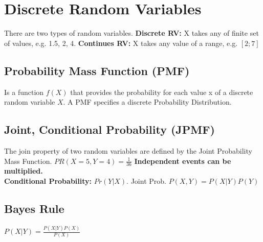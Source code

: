 \section{Discrete Random Variables}
There are two types of random variables.
\textbf{Discrete RV:} X takes any of finite set of values, e.g. {1.5, 2, 4}.
\textbf{Continues RV:} X takes any value of a range, e.g. $[2;7]$

\subsection{Probability Mass Function (PMF)}
Is a function $f(X)$ that provides the probability for each value x of a discrete random variable $X$. A PMF specifies a discrete Probability Distribution. 
\subsection{Joint, Conditional Probability (JPMF)}
The join property of two random variables are defined by the Joint Probability Mass Function. $PR(X=5, Y=4) = \frac{1}{36}$ \textbf{Independent events can be multiplied.} \\
\textbf{Conditional Probability:} $Pr(Y|X)$. Joint Prob. $P(X,Y) = P(X|Y)P(Y)$

\subsection{Bayes Rule}
$P(X|Y)=\frac{P(X|Y)P(X)}{P(X)}$